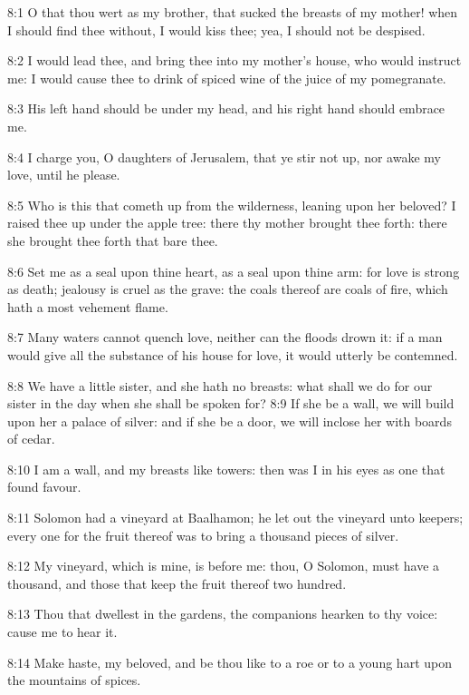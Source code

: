 8:1 O that thou wert as my brother, that sucked the breasts of my
mother!  when I should find thee without, I would kiss thee; yea, I
should not be despised.

8:2 I would lead thee, and bring thee into my mother's house, who
would instruct me: I would cause thee to drink of spiced wine of the
juice of my pomegranate.

8:3 His left hand should be under my head, and his right hand should
embrace me.

8:4 I charge you, O daughters of Jerusalem, that ye stir not up, nor
awake my love, until he please.

8:5 Who is this that cometh up from the wilderness, leaning upon her
beloved? I raised thee up under the apple tree: there thy mother
brought thee forth: there she brought thee forth that bare thee.

8:6 Set me as a seal upon thine heart, as a seal upon thine arm: for
love is strong as death; jealousy is cruel as the grave: the coals
thereof are coals of fire, which hath a most vehement flame.

8:7 Many waters cannot quench love, neither can the floods drown it:
if a man would give all the substance of his house for love, it would
utterly be contemned.

8:8 We have a little sister, and she hath no breasts: what shall we do
for our sister in the day when she shall be spoken for?  8:9 If she be
a wall, we will build upon her a palace of silver: and if she be a
door, we will inclose her with boards of cedar.

8:10 I am a wall, and my breasts like towers: then was I in his eyes
as one that found favour.

8:11 Solomon had a vineyard at Baalhamon; he let out the vineyard unto
keepers; every one for the fruit thereof was to bring a thousand
pieces of silver.

8:12 My vineyard, which is mine, is before me: thou, O Solomon, must
have a thousand, and those that keep the fruit thereof two hundred.

8:13 Thou that dwellest in the gardens, the companions hearken to thy
voice: cause me to hear it.

8:14 Make haste, my beloved, and be thou like to a roe or to a young
hart upon the mountains of spices.

